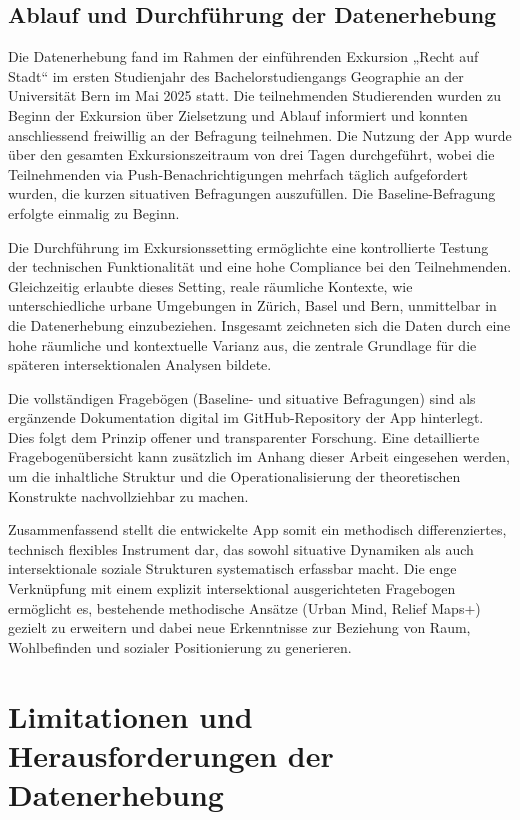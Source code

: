 \subsection{Ablauf und Durchführung der Datenerhebung}

Die Datenerhebung fand im Rahmen der einführenden Exkursion „Recht auf Stadt“ im ersten Studienjahr des Bachelorstudiengangs Geographie an der Universität Bern im Mai 2025 statt. Die teilnehmenden Studierenden wurden zu Beginn der Exkursion über Zielsetzung und Ablauf informiert und konnten anschliessend freiwillig an der Befragung teilnehmen. Die Nutzung der App wurde über den gesamten Exkursionszeitraum von drei Tagen durchgeführt, wobei die Teilnehmenden via Push-Benachrichtigungen mehrfach täglich aufgefordert wurden, die kurzen situativen Befragungen auszufüllen. Die Baseline-Befragung erfolgte einmalig zu Beginn.

Die Durchführung im Exkursionssetting ermöglichte eine kontrollierte Testung der technischen Funktionalität und eine hohe Compliance bei den Teilnehmenden. Gleichzeitig erlaubte dieses Setting, reale räumliche Kontexte, wie unterschiedliche urbane Umgebungen in Zürich, Basel und Bern, unmittelbar in die Datenerhebung einzubeziehen. Insgesamt zeichneten sich die Daten durch eine hohe räumliche und kontextuelle Varianz aus, die zentrale Grundlage für die späteren intersektionalen Analysen bildete.

Die vollständigen Fragebögen (Baseline- und situative Befragungen) sind als ergänzende Dokumentation digital im GitHub-Repository der App hinterlegt. Dies folgt dem Prinzip offener und transparenter Forschung. Eine detaillierte Fragebogenübersicht kann zusätzlich im Anhang dieser Arbeit eingesehen werden, um die inhaltliche Struktur und die Operationalisierung der theoretischen Konstrukte nachvollziehbar zu machen.

Zusammenfassend stellt die entwickelte App somit ein methodisch differenziertes, technisch flexibles Instrument dar, das sowohl situative Dynamiken als auch intersektionale soziale Strukturen systematisch erfassbar macht. Die enge Verknüpfung mit einem explizit intersektional ausgerichteten Fragebogen ermöglicht es, bestehende methodische Ansätze (Urban Mind, Relief Maps+) gezielt zu erweitern und dabei neue Erkenntnisse zur Beziehung von Raum, Wohlbefinden und sozialer Positionierung zu generieren.


\section{Limitationen und Herausforderungen der Datenerhebung}

